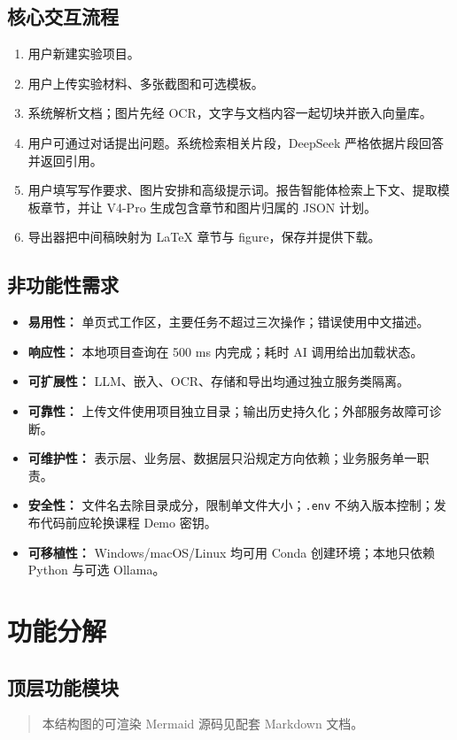 \documentclass[12pt,a4paper]{ctexart}
\begin{document}
\subsection{核心交互流程}
\begin{enumerate}
\item 用户新建实验项目。
\item 用户上传实验材料、多张截图和可选模板。
\item 系统解析文档；图片先经 OCR，文字与文档内容一起切块并嵌入向量库。
\item 用户可通过对话提出问题。系统检索相关片段，DeepSeek 严格依据片段回答并返回引用。
\item 用户填写写作要求、图片安排和高级提示词。报告智能体检索上下文、提取模板章节，并让 V4-Pro 生成包含章节和图片归属的 JSON 计划。
\item 导出器把中间稿映射为 LaTeX 章节与 figure，保存并提供下载。
\end{enumerate}
\subsection{非功能性需求}
\begin{itemize}
\item \textbf{易用性：} 单页式工作区，主要任务不超过三次操作；错误使用中文描述。
\item \textbf{响应性：} 本地项目查询在 500 ms 内完成；耗时 AI 调用给出加载状态。
\item \textbf{可扩展性：} LLM、嵌入、OCR、存储和导出均通过独立服务类隔离。
\item \textbf{可靠性：} 上传文件使用项目独立目录；输出历史持久化；外部服务故障可诊断。
\item \textbf{可维护性：} 表示层、业务层、数据层只沿规定方向依赖；业务服务单一职责。
\item \textbf{安全性：} 文件名去除目录成分，限制单文件大小；\texttt{.env} 不纳入版本控制；发布代码前应轮换课程 Demo 密钥。
\item \textbf{可移植性：} Windows/macOS/Linux 均可用 Conda 创建环境；本地只依赖 Python 与可选 Ollama。
\end{itemize}
\section{功能分解}
\subsection{顶层功能模块}
\begin{quote}\small 本结构图的可渲染 Mermaid 源码见配套 Markdown 文档。\end{quote}
\end{document}
